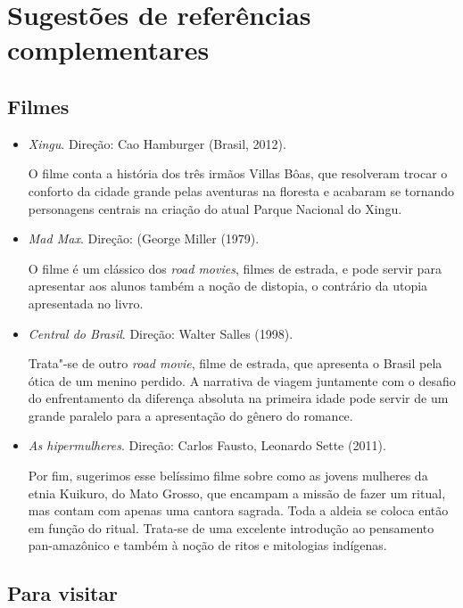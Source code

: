 \documentclass[12pt]{extarticle}
\begin{document}
\section{Sugestões de referências complementares}\label{sugestoes}

\subsection{Filmes}

\begin{itemize}
\item\emph{Xingu}. Direção: Cao Hamburger (Brasil, 2012).

O filme conta a história dos três irmãos Villas Bôas, que resolveram
trocar o conforto da cidade grande pelas aventuras na floresta e
acabaram se tornando personagens centrais na criação do atual Parque
Nacional do Xingu.

\item\emph{Mad Max}. Direção: (George Miller (1979).

O filme é um clássico dos \textit{road movies}, filmes de estrada, e pode servir para 
apresentar aos alunos também a noção de distopia, o contrário da utopia apresentada no livro. 

\item\emph{Central do Brasil}. Direção: Walter Salles (1998).

Trata"-se de outro \textit{road movie}, filme de estrada, que apresenta
o Brasil pela ótica de um menino perdido. A narrativa de viagem juntamente com o desafio 
do enfrentamento da diferença absoluta na primeira idade pode servir 
de um grande paralelo para a apresentação do gênero do romance. 

\item\emph{As hipermulheres}. Direção: Carlos Fausto, Leonardo Sette (2011).

Por fim, sugerimos esse belíssimo filme sobre como as jovens mulheres da etnia 
Kuikuro, do Mato Grosso, que encampam a missão de fazer um ritual, mas contam 
com apenas uma cantora sagrada. Toda a aldeia se coloca então em função do 
ritual. Trata-se de uma excelente introdução ao pensamento pan-amazônico e
também à noção de ritos e mitologias indígenas. 
\end{itemize}


\subsection{Para visitar}
\end{document}
